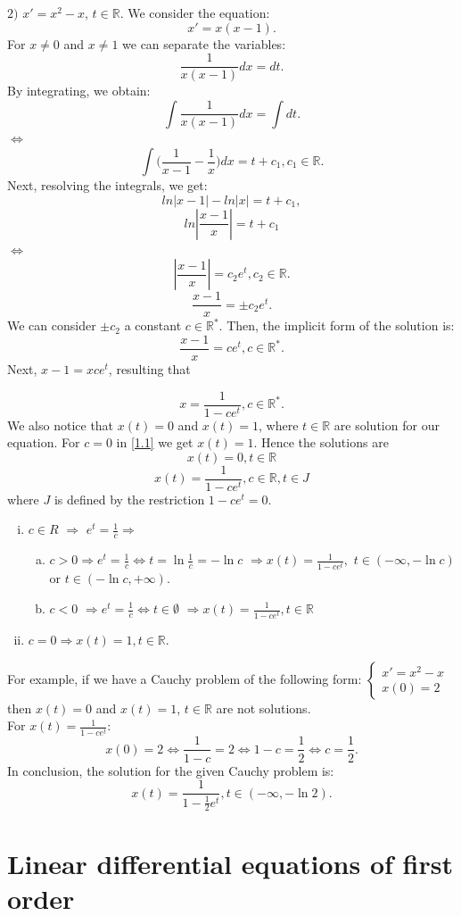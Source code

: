 \documentclass[a4paper,11pt]{report}
\newcommand{\R}{\mathbb{R}}
\begin{document}
$2)$ $x'=x^{2}-x$, $t\in \R.$ We consider the equation: $$x'=x(x-1).$$ For $x\neq0$ and $x\neq1$ we can separate the variables: $$\frac{1}{x(x-1)}dx=dt.$$ By integrating, we obtain: $$\int \frac{1}{x(x-1)} dx = \int dt.$$ $\Leftrightarrow$ $$\int \bigg(\frac{1}{x-1}-\frac{1}{x}\bigg)dx=t+c_{1}, c_{1} \in \R.$$ Next, resolving the integrals, we get:
$$ln|x-1|-ln|x|=t+c_{1},$$ $$ln|\frac{x-1}{x}|=t+c_{1}$$ $\Leftrightarrow$ $$|\frac{x-1}{x}|=c_{2}e^{t}, c_{2} \in \R.$$ $$\frac{x-1}{x}=\pm c_{2} e^{t}.$$ We can consider $\pm c_{2}$ a constant $c \in \R^{*}$. Then, the implicit form of the solution is: $$\frac{x-1}{x}=ce^{t}, c\in \R^{*}.$$ Next, $x-1=xce^{t}$, resulting that 

\begin{equation}
x=\frac{1}{1-ce^{t}}, c\in \R^{*}.
\end{equation}
We also notice that $x(t)=0$ and $x(t)=1$, where $t\in \R$ are solution for our equation. For $c=0$ in \eqref{1.1} we get $x(t)=1$. Hence the solutions are $$x(t)=0, t\in\R$$ $$x(t)=\frac{1}{1-ce^{t}}, c\in \R, t\in J$$ where $J$ is defined by the restriction $1-ce^{t}=0$.
\begin{enumerate}[(i)]
 \item $c \in R$ $\Rightarrow$ $e^{t}=\frac{1}{c}\Rightarrow$
 \begin{enumerate}[(a)]
  \item $c>0\Rightarrow e^{t}=\frac{1}{c} \Leftrightarrow t=\ln{\frac{1}{c}}=-\ln {c}$ $\Rightarrow x(t)=\frac{1}{1-ce^{t}},$ $t\in (-\infty,-\ln{c})$ or $t\in (-\ln{c},+\infty)$.
  \item $c<0$ $\Rightarrow e^{t}=\frac{1}{c} \Leftrightarrow t\in \emptyset$ $\Rightarrow x(t)=\frac{1}{1-ce^{t}}, t\in \R$
 \end{enumerate}
 \item $c=0 \Rightarrow x(t)=1, t\in \R.$
\end{enumerate}
For example, if we have a Cauchy problem of the following form:
$\begin{cases}
  x'=x^{2}-x\\
  x(0)=2
 \end{cases}
$
then $x(t)=0$ and $x(t)=1$, $t\in \R$ are not solutions.\\
For $x(t)=\frac{1}{1-ce^{t}}$: $$x(0)=2 \Leftrightarrow \frac{1}{1-c}=2 \Leftrightarrow 1-c=\frac{1}{2} \Leftrightarrow c=\frac{1}{2}.$$ In conclusion, the solution for the given Cauchy problem is:$$x(t)=\frac{1}{1-\frac{1}{2}e^{t}}, t\in (-\infty,-\ln{2}).$$


\section{Linear differential equations of first order}
\end{document}
